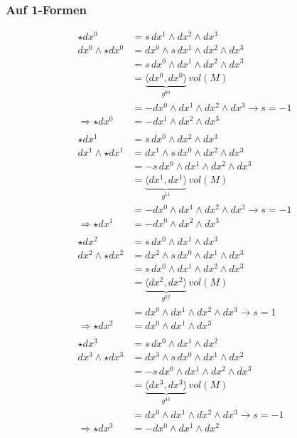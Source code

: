 \subsubsection{Auf 1-Formen}
\begin{align*}
	\star dx^0 
	&=
	s \, dx^1 \wedge dx^2 \wedge dx^3
	\\
	dx^0 \wedge \star dx^0 
	&=
	dx^0 \wedge s \, dx^1 \wedge dx^2 \wedge dx^3 
	\\
	&=
	s \, dx^0 \wedge dx^1 \wedge dx^2 \wedge dx^3
	\\
	&=
	\underbrace{\langle dx^0, dx^0 \rangle}_{g^{00}} \, vol(M) 
	\\
	&= - dx^0 \wedge dx^1 \wedge dx^2 \wedge dx^3 \rightarrow s = -1
	\\
	\Rightarrow \star dx^0 
	&=
	- dx^1 \wedge dx^2 \wedge dx^3
\\
\\
	\star dx^1 
	&=
	s \, dx^0 \wedge dx^2 \wedge dx^3
	\\
	dx^1 \wedge \star dx^1 
	&=
	dx^1 \wedge s \, dx^0 \wedge dx^2 \wedge dx^3 
	\\
	&=
	-s \, dx^0 \wedge dx^1 \wedge dx^2 \wedge dx^3
	\\
	&=
	\underbrace{\langle dx^1, dx^1 \rangle}_{g^{11}} \, vol(M) 
	\\
	&=
	- dx^0 \wedge dx^1 \wedge dx^2 \wedge dx^3 \rightarrow s = -1
	\\
	\Rightarrow \star dx^1 
	&=
	- dx^0 \wedge dx^2 \wedge dx^3
\\
\\
	\star dx^2 
	&=
	s \, dx^0 \wedge dx^1 \wedge dx^3
	\\
	dx^2 \wedge \star dx^2 
	&=
	dx^2 \wedge s \, dx^0 \wedge dx^1 \wedge dx^3 
	\\
	&=
	s \, dx^0 \wedge dx^1 \wedge dx^2 \wedge dx^3
	\\
	&=
	\underbrace{\langle dx^2, dx^2 \rangle}_{g^{22}} \, vol(M) 
	\\
	&=
	dx^0 \wedge dx^1 \wedge dx^2 \wedge dx^3 \rightarrow s = 1
	\\
	\Rightarrow \star dx^2 
	&=
	dx^0 \wedge dx^1 \wedge dx^3
\\
\\
	\star dx^3 
	&=
	s \, dx^0 \wedge dx^1 \wedge dx^2
	\\
	dx^3 \wedge \star dx^3 
	&=
	dx^3 \wedge s \, dx^0 \wedge dx^1 \wedge dx^2 
	\\
	&= -s \, dx^0 \wedge dx^1 \wedge dx^2 \wedge dx^3
	\\
	&=
	\underbrace{\langle dx^3, dx^3 \rangle}_{g^{33}} \, vol(M) 
	\\
	&=
	dx^0 \wedge dx^1 \wedge dx^2 \wedge dx^3 \rightarrow s = -1
	\\
	\Rightarrow \star dx^3 
	&=
	-dx^0 \wedge dx^1 \wedge dx^2
\end{align*}

